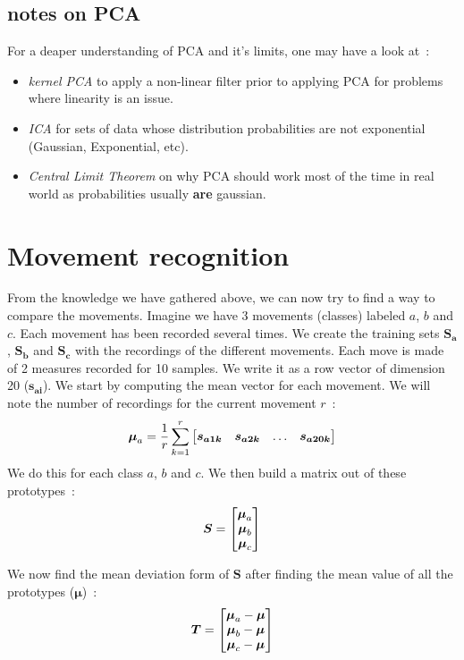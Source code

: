 \documentclass[11pt,twocolumn]{amsart} %
\newcommand{\ve}[1]{\boldsymbol{#1}}
\newcommand{\ma}[1]{\boldsymbol{#1}}
\newenvironment{m}{\begin{bmatrix}}{\end{bmatrix}}
\begin{document}
\subsection{notes on PCA}

For a deaper understanding of PCA and it's limits, one may have a look at~:
\begin{itemize}
  \item \emph{kernel PCA} to apply a non-linear filter prior to applying PCA for problems where linearity is an issue.
  \item \emph{ICA} for sets of data whose distribution probabilities are not exponential (Gaussian, Exponential, etc).
  \item \emph{Central Limit Theorem} on why PCA should work most of the time in real world as probabilities usually \textbf{are} gaussian.
\end{itemize}

\section{Movement recognition}

From the knowledge we have gathered above, we can now try to find a way to compare the movements. Imagine we have 3 movements (classes) labeled $a$, $b$ and $c$. Each movement has been recorded several times. We create the training sets $\ma{S_a}$, $\ma{S_b}$ and $\ma{S_c}$ with the recordings of the different movements. Each move is made of 2 measures recorded for 10 samples. We write it as a row vector of dimension 20 ($\ve{s_{ai}}$). We start by computing the mean vector for each movement. We will note the number of recordings for the current movement $r$~:
\[
  \ve\mu_a = \frac{1}{r}\sum_{k=1}^r \begin{m}\ve{s_{a1k}} & \ve{s_{a2k}} & \hdots & \ve{s_{a20k}} \end{m}
\]
We do this for each class $a$, $b$ and $c$. We then build a matrix out of these prototypes~:
\[
  \ma{S} = \begin{m}\ve\mu_a \\ \ve\mu_b \\ \ve\mu_c \end{m}
\]

We now find the mean deviation form of $\ma{S}$ after finding the mean value of all the prototypes ($\ve\mu$)~:
\[
  \ma{T} = \begin{m}\ve\mu_a - \ve\mu \\ \ve\mu_b - \ve\mu \\ \ve\mu_c - \ve\mu \end{m}
\]
\end{document}
